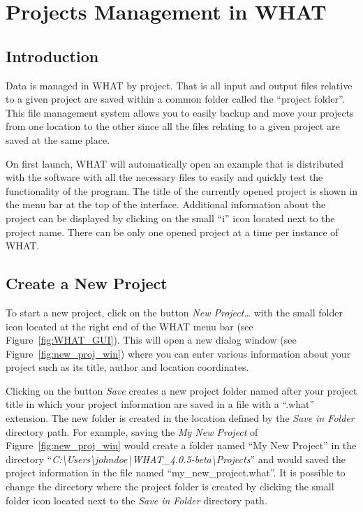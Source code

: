 \documentclass[12pt, letterpaper, fleqn]{report}
\begin{document}
\section{Projects Management in WHAT}

\subsection{Introduction}

Data is managed in WHAT by project. That is all input and output files relative to a given project are saved within a common folder called the ``project folder''. This file management system allows you to easily backup and move your projects from one location to the other since all the files relating to a given project are saved at the same place. 

On first launch, WHAT will automatically open an example that is distributed with the software with all the necessary files to easily and quickly test the functionality of the program. The title of the currently opened project is shown in the menu bar at the top of the interface. Additional information about the project can be displayed by clicking on the small ``i'' icon located next to the project name. There can be only one opened project at a time per instance of WHAT. 

\subsection{Create a New Project}

To start a new project, click on the button \textsl{New Project\dots} with the small folder icon located at the right end of the WHAT menu bar (see Figure~\ref{fig:WHAT_GUI}). This will open a new dialog window (see Figure~\ref{fig:new_proj_win}) where you can enter various information about your project such as its title, author and location coordinates. 

Clicking on the button \textsl{Save} creates a new project folder named after your project title in which your project information are saved in a file with a ``.what'' extension. The new folder is created in the location defined by the \textsl{Save in Folder} directory path. For example, saving the \textsl{My New Project} of Figure~\ref{fig:new_proj_win} would create a folder named ``My New Project'' in the directory ``\textsl{C:\textbackslash{}Users\textbackslash{}johndoe\textbackslash{}WHAT\_4.0.5-beta\textbackslash{}Projects}'' and would saved the project information in the file named ``my\_new\_project.what''. It is possible to change the directory where the project folder is created by clicking the small folder icon located next to the \textsl{Save in Folder} directory path.
\end{document}

